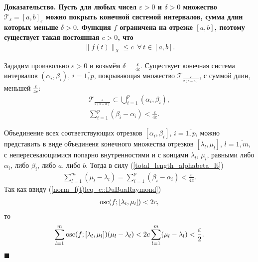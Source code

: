 \documentclass{report}
\newenvironment{Proof}{\par\noindent\bf Доказательство.\rm}{ $\blacksquare$\par}
\newcommand{\osc}{\mathop{\rm osc}\nolimits}
\begin{document}
\begin{Proof}
Пусть для любых чисел $\varepsilon>0$ и $\delta>0$ множество $\mathcal{T}_\varepsilon=[a,b]_\varepsilon$ можно покрыть конечной системой интервалов, сумма длин которых меньше $\delta>0$.
Функция $f$ ограничена на отрезке $[a,b]$, поэтому существует такая постоянная $c>0$, что
\begin{gather}\label{norm_f(t)leq_c::DuBuaRaymond}
\|f(t)\|_X\leqslant c\,\,\,\forall\,t\in[a,b].
\end{gather}

Зададим произвольно $\varepsilon>0$ и возьмём $\delta=\frac{\varepsilon}{4c}$. Существует конечная система интервалов $(\alpha_i,\beta_i)$, $i=\overline{1,p}$, покрывающая множество
$\mathcal{T}_{\frac{\varepsilon}{2(b-a)}}$, с суммой длин, меньшей $\frac{\varepsilon}{4c}$:
\begin{gather}
\label{calTeps2b-asubset}
\mathcal{T}_{\frac{\varepsilon}{2(b-a)}}\subset\bigcup\limits_{i=1}^p(\alpha_i,\beta_i),\\
\label{total_length_alphabeta_lt}
\sum\limits_{i=1}^p(\beta_i-\alpha_i)<\frac{\varepsilon}{4c}.
\end{gather}

Объединение всех соответствующих отрезков $[\alpha_i,\beta_i]$, $i=\overline{1,p}$, можно представить в виде объединеня конечного множества отрезков $[\lambda_l,\mu_l]$, $l=\overline{1,m}$,
с непересекающимися попарно внутренностями и с концами $\lambda_l$, $\mu_l$, равными либо $\alpha_i$, либо $\beta_i$, либо $a$, либо $b$. Тогда в силу (\ref{total_length_alphabeta_lt})
\begin{gather*}
\sum\limits_{l=1}^m(\mu_l-\lambda_l)=\sum\limits_{i=1}^p(\beta_i-\alpha_i)<\frac{\varepsilon}{4c}.
\end{gather*}
Так как ввиду (\ref{norm_f(t)leq_c::DuBuaRaymond})
\begin{gather*}
\osc(f;[\lambda_l,\mu_l])<2c,
\end{gather*}
то
\begin{gather*}
\sum\limits_{l=1}^m\osc(f;[\lambda_l,\mu_l])(\mu_l-\lambda_l)<2c\sum\limits_{l=1}^m(\mu_l-\lambda_l)<\frac\varepsilon2.
\end{gather*}


\end{Proof}
\end{document}
